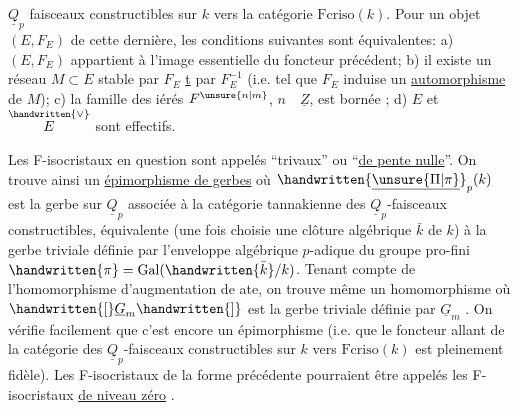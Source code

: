 
$\underline{Q}_p$ faisceaux constructibles sur $k$ vers la catégorie $\mathrm{Fcriso}(k)$. Pour un objet $(E,F_E)$ de cette dernière, les conditions suivantes sont équivalentes: a) $(E,F_E)$ appartient à l'image essentielle du foncteur précédent; b) il existe un réseau $M\subset E$ stable par $F_E$  \uline{t} par $F_E^{-1}$ (i.e. tel que $F_E$ induise un \uline{automorphisme} de $M$); c) la famille des iérés $F^{\unsure{n|m}}$, $n\quad\underline{Z}$, est bornée ; d) $E$ et $\overset{\handwritten{\vee}}{E}$ sont effectifs.

Les F-isocristaux en question sont appelés ``trivaux'' ou ``\uline{de pente nulle}''. On trouve ainsi un \uline{épimorphisme de gerbes}
où $\handwritten{\underline{\unsure{\Pi|\pi}}}_p(k)$ est la gerbe sur $\underline{Q}_p$  associée à la catégorie tannakienne des $\underline{Q}_p$-faisceaux constructibles, équivalente  (une fois choisie une clôture algébrique $\bar{k}$ de $k$) à la gerbe triviale définie par l'enveloppe algébrique  $p$-adique du groupe pro-fini $\handwritten{\pi}=\operatorname{Gal}(\handwritten{\bar{k}}/k)$. Tenant compte de l'homomorphisme d'augmentation de ate, on trouve même un homomorphisme
où $\handwritten{[}\underline{G}_m\handwritten{]}$ est la gerbe triviale définie par $\underline{G}_m$ . On vérifie facilement que c'est encore un épimorphisme (i.e. que le foncteur
allant de la catégorie des  $\underline{Q}_p$-faisceaux constructibles  sur $k$ vers $\mathrm{Fcriso}(k)$ est pleinement fidèle). Les F-isocristaux de la forme précédente pourraient être appelés les F-isocristaux \uline{de niveau zéro} .

